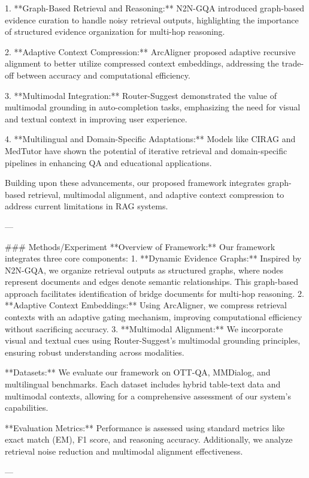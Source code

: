 1. **Graph-Based Retrieval and Reasoning:** N2N-GQA introduced graph-based evidence curation to handle noisy retrieval outputs, highlighting the importance of structured evidence organization for multi-hop reasoning.
   
2. **Adaptive Context Compression:** ArcAligner proposed adaptive recursive alignment to better utilize compressed context embeddings, addressing the trade-off between accuracy and computational efficiency.

3. **Multimodal Integration:** Router-Suggest demonstrated the value of multimodal grounding in auto-completion tasks, emphasizing the need for visual and textual context in improving user experience.

4. **Multilingual and Domain-Specific Adaptations:** Models like CIRAG and MedTutor have shown the potential of iterative retrieval and domain-specific pipelines in enhancing QA and educational applications.

Building upon these advancements, our proposed framework integrates graph-based retrieval, multimodal alignment, and adaptive context compression to address current limitations in RAG systems.

---

### Methods/Experiment  
**Overview of Framework:**  
Our framework integrates three core components:  
1. **Dynamic Evidence Graphs:** Inspired by N2N-GQA, we organize retrieval outputs as structured graphs, where nodes represent documents and edges denote semantic relationships. This graph-based approach facilitates identification of bridge documents for multi-hop reasoning.  
2. **Adaptive Context Embeddings:** Using ArcAligner, we compress retrieval contexts with an adaptive gating mechanism, improving computational efficiency without sacrificing accuracy.  
3. **Multimodal Alignment:** We incorporate visual and textual cues using Router-Suggest's multimodal grounding principles, ensuring robust understanding across modalities.

**Datasets:**  
We evaluate our framework on OTT-QA, MMDialog, and multilingual benchmarks. Each dataset includes hybrid table-text data and multimodal contexts, allowing for a comprehensive assessment of our system's capabilities.

**Evaluation Metrics:**  
Performance is assessed using standard metrics like exact match (EM), F1 score, and reasoning accuracy. Additionally, we analyze retrieval noise reduction and multimodal alignment effectiveness.

---

